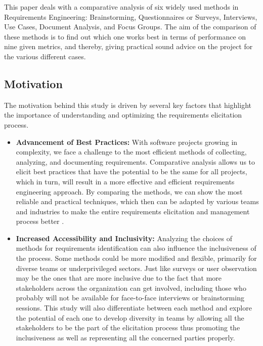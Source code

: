 \documentclass[conference]{IEEEtran}
\begin{document}
This paper deals with a comparative analysis of six widely used methods in Requirements Engineering: Brainstorming, Questionnaires or Surveys, Interviews, Use Cases, Document Analysis, and Focus Groups. The aim of the comparison of these methods is to find out which one works best in terms of performance on nine given metrics, and thereby, giving practical sound advice on the project for the various different cases.

\subsection{Motivation}

The motivation behind this study is driven by several key factors that highlight the importance of understanding and optimizing the requirements elicitation process. 

\begin{itemize}
    \item \textbf{Advancement of Best Practices:} With software projects growing in complexity, we face a challenge to the most efficient methods of collecting, analyzing, and documenting requirements. Comparative analysis allows us to elicit best practices that have the potential to be the same for all projects, which in turn, will result in a more effective and efficient requirements engineering approach. By comparing the methods, we can show the most reliable and practical techniques, which then can be adapted by various teams and industries to make the entire requirements elicitation and management process better \cite{cite1}.
    
    \item \textbf{Increased Accessibility and Inclusivity:} Analyzing the choices of methods for requirements identification can also influence the inclusiveness of the process. Some methods could be more modified and flexible, primarily for diverse teams or underprivileged sectors. Just like surveys or user observation may be the ones that are more inclusive due to the fact that more stakeholders across the organization can get involved, including those who probably will not be available for face-to-face interviews or brainstorming sessions. This study will also differentiate between each method and explore the potential of each one to develop diversity in teams by allowing all the stakeholders to be the part of the elicitation process thus promoting the inclusiveness as well as representing all the concerned parties properly. 
\end{itemize}
\end{document}
